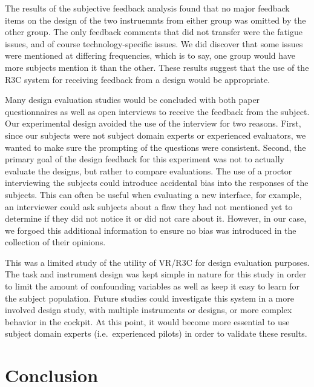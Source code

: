 The results of the subjective feedback analysis found that no major feedback items on the design of the two instruemnts from either group was omitted by the other group.
The only feedback comments that did not transfer were the fatigue issues, and of course technology-specific issues.
We did discover that some issues were mentioned at differing frequencies, which is to say, one group would have more subjects mention it than the other.
These results suggest that the use of the R3C system for receiving feedback from a design would be appropriate.

Many design evaluation studies would be concluded with both paper questionnaires as well as open interviews to receive the feedback from the subject.
Our experimental design avoided the use of the interview for two reasons.
First, since our subjects were not subject domain experts or experienced evaluators, we wanted to make sure the prompting of the questions were consistent.
Second, the primary goal of the design feedback for this experiment was not to actually evaluate the designs, but rather to compare evaluations.
The use of a proctor interviewing the subjects could introduce accidental bias into the responses of the subjects.
This can often be useful when evaluating a new interface, for example, an interviewer could ask subjects about a flaw they had not mentioned yet to determine if they did not notice it or did not care about it.
However, in our case, we forgoed this additional information to ensure no bias was introduced in the collection of their opinions.


This was a limited study of the utility of VR/R3C for design evaluation purposes.
The task and instrument design was kept simple in nature for this study in order to limit the amount of confounding variables as well as keep it easy to learn for the subject population.
Future studies could investigate this system in a more involved design study, with multiple instruments or designs, or more complex behavior in the cockpit.
At this point, it would become more essential to use subject domain experts (i.e.\ experienced pilots) in order to validate these results.

\section{Conclusion}
